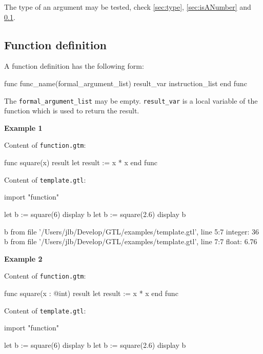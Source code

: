 \documentclass[10pt,openright,twosides,final]{memoir}
\newcommand{\gtlinline}[1]{\colorbox{light-blue}{\lstinline[language=gtl]{#1}}}
\newcommand{\examplen}[1]{\vspace{.75em}\noindent\textbf{Example #1}\vspace{0em}}
\begin{document}
The type of an argument may be tested, check \ref{sec:type}, \ref{sec:isANumber} and \ref{sec:function}.

\subsection{Function definition}
\label{sec:function}

A function definition has the following form:

\begin{gtl}
func func_name(formal_argument_list) result_var
  instruction_list
end func
\end{gtl}

The \gtlinline{formal_argument_list} may be empty. \gtlinline{result_var} is a local variable of the function which is used to return the result.

\examplen{1}

\noindent Content of \texttt{\footnotesize function.gtm}:
\begin{gtl}
func square(x) result
  let result := x * x
end func
\end{gtl}
\noindent Content of \texttt{\footnotesize template.gtl}:
\begin{gtl}
import "function"

let b := square(6)
display b
let b := square(2.6)
display b
\end{gtl}
\begin{console}
b from file '/Users/jlb/Develop/GTL/examples/template.gtl', line 5:7
    integer: 36
b from file '/Users/jlb/Develop/GTL/examples/template.gtl', line 7:7
    float: 6.76
\end{console}

\examplen{2}

\noindent Content of \texttt{\footnotesize function.gtm}:
\begin{gtl}
func square(x : @int) result
  let result := x * x
end func
\end{gtl}
\noindent Content of \texttt{\footnotesize template.gtl}:
\begin{gtl}
import "function"

let b := square(6)
display b
let b := square(2.6)
display b
\end{gtl}
\end{document}
